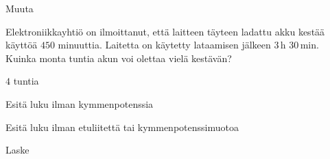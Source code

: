\begin{tehtavasivu}

\begin{tehtava}
Muuta
  \begin{vastaus}
  \end{vastaus}
\end{tehtava}

\begin{tehtava}
Elektroniikkayhtiö on ilmoittanut, että laitteen täyteen ladattu akku kestää käyttöä $450$ minuuttia. Laitetta on käytetty lataamisen jälkeen $3$\,h $30$\,min. Kuinka monta tuntia akun voi olettaa vielä kestävän?
\begin{vastaus}
$4$ tuntia
\end{vastaus}
\end{tehtava}

\begin{tehtava}
Esitä luku ilman kymmenpotenssia
\begin{vastaus}
\end{vastaus}
\end{tehtava}



\begin{tehtava}
Esitä luku ilman etuliitettä tai kymmenpotenssimuotoa
\begin{vastaus}
\end{vastaus}
\end{tehtava}

\begin{tehtava}
Laske
\begin{vastaus}
\end{vastaus}
\end{tehtava}



\end{tehtavasivu}
